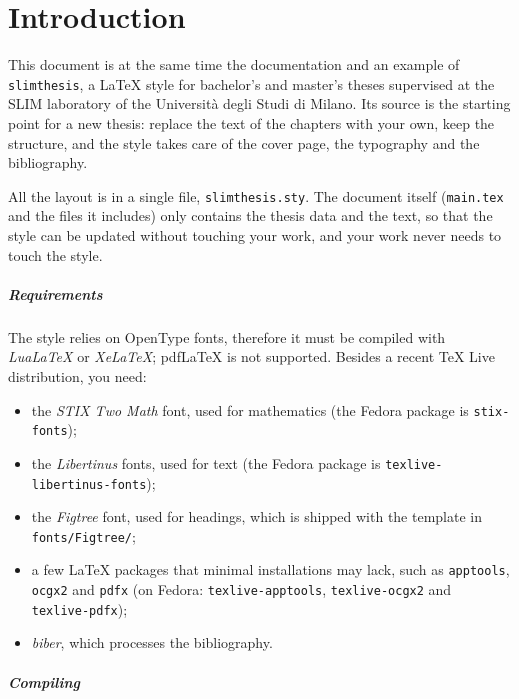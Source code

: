\chapter*{Introduction}

This document is at the same time the documentation and an example of
\texttt{slimthesis}, a \LaTeX{} style for bachelor's and master's theses
supervised at the SLIM laboratory of the Università degli Studi di Milano.
Its source is the starting point for a new thesis: replace the text of the
chapters with your own, keep the structure, and the style takes care of the
cover page, the typography and the bibliography.

All the layout is in a single file, \texttt{slimthesis.sty}. The document
itself (\texttt{main.tex} and the files it includes) only contains the thesis
data and the text, so that the style can be updated without touching your
work, and your work never needs to touch the style.

\paragraph{Requirements}

The style relies on OpenType fonts, therefore it must be compiled with
\emph{LuaLaTeX} or \emph{XeLaTeX}; pdf\LaTeX{} is not supported. Besides a
recent \TeX{} Live distribution, you need:
\begin{itemize}
  \item the \emph{STIX Two Math} font, used for mathematics (the Fedora
    package is \nolinkurl{stix-fonts});
  \item the \emph{Libertinus} fonts, used for text (the
    Fedora package is \nolinkurl{texlive-libertinus-fonts});
  \item the \emph{Figtree} font, used for headings, which is shipped with the
    template in \nolinkurl{fonts/Figtree/};
  \item a few \LaTeX{} packages that minimal installations may lack, such as
    \texttt{apptools}, \texttt{ocgx2} and \texttt{pdfx} (on Fedora:
    \nolinkurl{texlive-apptools}, \nolinkurl{texlive-ocgx2} and
    \nolinkurl{texlive-pdfx});
  \item \emph{biber}, which processes the bibliography.
\end{itemize}

\paragraph{Compiling}

